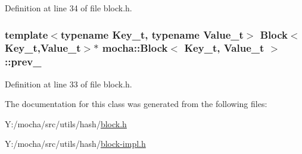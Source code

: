 Definition at line 34 of file block.h.

\hypertarget{classmocha_1_1_block_ae8d39631c54d02454b942bc17304df98}{
\subsubsection[{prev\_\-}]{\setlength{\rightskip}{0pt plus 5cm}template$<$typename Key\_\-t, typename Value\_\-t$>$ {\bf Block}$<$Key\_\-t,Value\_\-t$>$$\ast$ {\bf mocha::Block}$<$ Key\_\-t, Value\_\-t $>$::{\bf prev\_\-}}}
\label{classmocha_1_1_block_ae8d39631c54d02454b942bc17304df98}


Definition at line 33 of file block.h.



The documentation for this class was generated from the following files:\begin{DoxyCompactItemize}
\item 
Y:/mocha/src/utils/hash/\hyperlink{block_8h}{block.h}\item 
Y:/mocha/src/utils/hash/\hyperlink{block-impl_8h}{block-\/impl.h}\end{DoxyCompactItemize}
